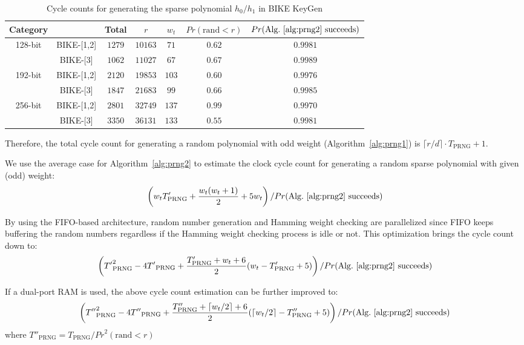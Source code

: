 \documentclass[runningheads]{llncs}
\begin{document}
\begin{table}[!tb]\centering
\caption{Cycle counts for generating the sparse polynomial $h_0/h_1$ in BIKE KeyGen}
\begin{tabular}{cc|ccccc}
  \hline
 \textbf{Category}        &             & Total & $r$  & $w_t$  & $Pr(\text{rand} < r)$& $Pr(\text{Alg.~\ref{alg:prng2} succeeds})$\\\hline
\multirow{ 2}{*}{128-bit} &  BIKE-[1,2] & $1279$ & $10163$  & $71$  & $0.62$ & $0.9981$\\
                          &  BIKE-[3] & $1062$ & $11027$  & $67$  & $0.67$& $0.9989$\\
  \hline
\multirow{ 2}{*}{192-bit} &  BIKE-[1,2] & $2120$ & $19853$  & $103$  &$0.60$& $0.9976$\\
                          &  BIKE-[3] & $1847$ & $21683$  & $99$  &$0.66$& $0.9985$\\
  \hline
\multirow{ 2}{*}{256-bit} &  BIKE-[1,2] & $2801$ & $32749$  & $137$  &$0.99$& $0.9970$\\
                          &  BIKE-[3] & $3350$ & $36131$  & $133$  &$0.55$& $0.9981$\\
  \hline
\end{tabular}
\vspace{-4mm}
\end{table}

Therefore, the total cycle count for generating a random polynomial with odd weight (Algorithm~\ref{alg:prng1}) is  
$\lceil r/d\rceil\cdot T_{\text{PRNG}} + 1$.


We use the average case for Algorithm~\ref{alg:prng2} to estimate the clock cycle count for generating a random sparse polynomial with given (odd) weight:
\[
   \left(w_tT'_{\text{PRNG}} + \frac{w_t(w_t+1)}{2} + 5w_t\right)/Pr(\text{Alg.~\ref{alg:prng2} succeeds})
\]

By using the FIFO-based architecture, random number generation and
Hamming weight checking are parallelized since FIFO keeps buffering
the random numbers regardless if the Hamming weight checking
process is idle or not. This optimization brings the cycle count down to:
\[
    \left({T'}_{\text{PRNG}}^2 - 4{T'}_{\text{PRNG}} + \frac{T'_{\text{PRNG}}+w_t+6}{2}(w_t-T'_{\text{PRNG}}+5)\right)/Pr(\text{Alg.~\ref{alg:prng2} succeeds})
\]

If a dual-port RAM is used, the above cycle count estimation can be further improved to:
\[
    \left({T''}_{\text{PRNG}}^2 - 4{T''}_{\text{PRNG}} + \frac{T''_{\text{PRNG}}+\lceil w_t/2\rceil+6}{2}(\lceil w_t/2\rceil-T''_{\text{PRNG}}+5)\right)/Pr(\text{Alg.~\ref{alg:prng2} succeeds})
\]
where ${T''}_{\text{PRNG}}=T_{\text{PRNG}}/{Pr}^2(\text{rand} < r)$
\end{document}
